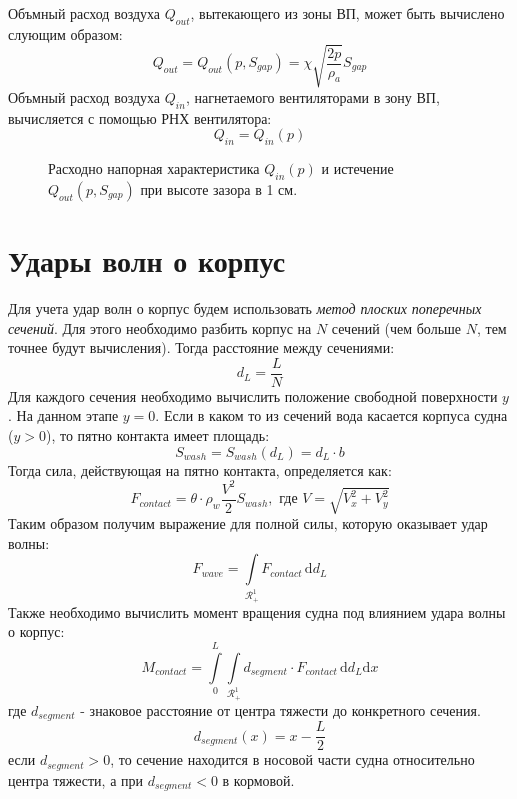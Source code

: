 \documentclass{article}%
\numberwithin{equation}{subsection}
\let\oldsection\section%
\renewcommand{\section}{%
  \renewcommand{\theequation}{\thesection.\arabic{equation}}%
  \oldsection}%
\begin{document}
Объмный расход воздуха $Q_{out}$, вытекающего из зоны ВП, может быть вычислено слующим образом:
\begin{equation}
    Q_{out}=Q_{out}(p, S_{gap})=\chi\sqrt{\dfrac{2p}{\rho_{a}}}S_{gap}
\end{equation}
Объмный расход воздуха $Q_{in}$, нагнетаемого вентиляторами в зону ВП, вычисляется с помощью РНХ вентилятора:
\begin{equation}
    Q_{in}=Q_{in}(p)
\end{equation}
\begin{figure}[H]
    \centering
    
    \caption{Расходно напорная характеристика $Q_{in}(p)$ и истечение $Q_{out}(p, S_{gap})$ при высоте зазора в 1 см.}
\end{figure}

\section{Удары волн о корпус}
Для учета удар волн о корпус будем использовать {\it метод плоских поперечных сечений}. Для этого необходимо разбить корпус на $N$ сечений (чем больше $N$, тем точнее будут вычисления). Тогда расстояние между сечениями:
\begin{equation}
    d_L = \dfrac{L}{N}
\end{equation}
Для каждого сечения необходимо вычислить положение свободной поверхности $y$. На данном этапе $y=0$. Если в каком то из сечений вода касается корпуса судна ($y>0$), то пятно контакта имеет площадь:
\begin{equation}
    S_{wash} = S_{wash}(d_L) = d_L \cdot b
\end{equation}
Тогда сила, действующая на пятно контакта, определяется как:
\begin{equation}
    F_{contact} = \theta\cdot\rho_{w} \dfrac{V^2}{2}S_{wash}, \text{ где } V = \sqrt{V_x^2 + V_y^2}
\end{equation}
Таким образом получим выражение для полной силы, которую оказывает удар волны:
\begin{equation}
    F_{wave} = \int\limits_{\mathcal{R}_{+}^{1}}F_{contact}\,\mathrm{d}d_L
\end{equation}
Также необходимо вычислить момент вращения судна под влиянием удара волны о корпус:
\begin{equation}
    M_{contact} = \int\limits_{0}^{L}\int\limits_{\mathcal{R}_{+}^{1}} d_{segment} \cdot F_{contact}\,\mathrm{d}d_L\mathrm{d}x
\end{equation}
где $d_{segment}$ - знаковое расстояние от центра тяжести до конкретного сечения.
\begin{equation}
    d_{segment}(x) = x - \dfrac{L}{2}
\end{equation}
если $d_{segment} > 0$, то сечение находится в носовой части судна относительно центра тяжести, а при $d_{segment} < 0$ в кормовой.
\end{document}
